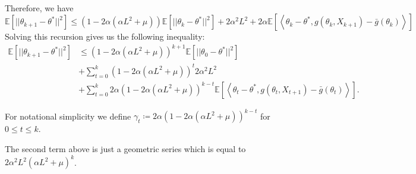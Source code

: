 \documentclass[a4paper]{article}
\begin{document}
\\
Therefore, we have
\begin{equation}
	\mathbb{E}\left[||\theta_{k +‌ 1} - \theta^{*}||^{2}\right] \le \left(1 - 2\alpha\left(\alpha L^{2} + \mu\right)\right)\mathbb{E}\left[||\theta_{k} - \theta^{*}||^{2}\right] +‌ 2\alpha^{2}L^{2} + 2\alpha\mathbb{E}\left[\left\langle \theta_{k} - \theta^{*}, g\left(\theta_{k}, X_{k + 1}\right) - \bar{g}\left(\theta_{k}\right)\right\rangle\right]
\end{equation}
Solving this recursion gives us the following inequality:
\begin{equation}
	\begin{split}
		\mathbb{E}\left[||\theta_{k + 1} - \theta^{*}||^{2}\right] & \le \left(1 - 2\alpha\left(\alpha L^{2} + \mu\right)\right)^{k + 1}\mathbb{E}\left[||\theta_{0} - \theta^{*}||^{2}\right] \\
		& + \sum_{t = 0}^{k}\left(1 - 2\alpha\left(\alpha L^{2} + \mu\right)\right)^{t}2\alpha^{2}L^{2} \\
		& + \sum_{t = 0}^{k}2\alpha\left(1 - 2\alpha\left(\alpha L^{2} + \mu\right)\right)^{k - t}\mathbb{E}\left[\left\langle \theta_{t} - \theta^{*}, g\left(\theta_{t}, X_{t + 1}\right) - \bar{g}\left(\theta_{t}\right) \right\rangle\right].
	\end{split}
\end{equation}

For notational simplicity we define $\gamma_{t} \coloneq 2\alpha\left(1 - 2\alpha\left(\alpha L^{2} + \mu\right)\right)^{k - t}$ for $0 \le t \le k$.

The second term above is just a geometric series which is equal to $2\alpha^{2}L^{2}\left(\alpha L^{2} + \mu\right)^{k}$.
\end{document}
